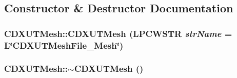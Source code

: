 \subsection{Constructor \& Destructor Documentation}
\hypertarget{class_c_d_x_u_t_mesh_a4df4f33a650593f6e6898d21fa0d1a41}{
\subsubsection[{CDXUTMesh}]{\setlength{\rightskip}{0pt plus 5cm}CDXUTMesh::CDXUTMesh (LPCWSTR {\em strName} = {\ttfamily L\char`\"{}CDXUTMeshFile\_\-Mesh\char`\"{}})}}
\label{class_c_d_x_u_t_mesh_a4df4f33a650593f6e6898d21fa0d1a41}
\hypertarget{class_c_d_x_u_t_mesh_abbf5790190a5b26f1ad7111884ef2cac}{
\subsubsection[{$\sim$CDXUTMesh}]{\setlength{\rightskip}{0pt plus 5cm}CDXUTMesh::$\sim$CDXUTMesh ()}}
\label{class_c_d_x_u_t_mesh_abbf5790190a5b26f1ad7111884ef2cac}


